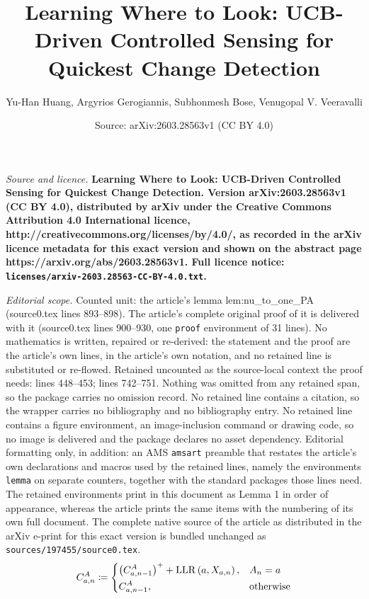 \documentclass[10pt,a4paper]{amsart}
\title{\LARGE \bf Learning Where to Look: UCB-Driven Controlled Sensing for Quickest Change Detection}
\author{Yu-Han Huang, Argyrios Gerogiannis, Subhonmesh Bose, Venugopal V. Veeravalli}
\date{Source: arXiv:2603.28563v1 (CC BY 4.0)}
\newcommand{\lp}{\left(}
\newcommand{\mrm}{\mathrm}
\newcommand{\rp}{\right)}
\begin{document}
\maketitle

\noindent\emph{Source and licence.} \LARGE \bf Learning Where to Look: UCB-Driven Controlled Sensing for Quickest Change Detection. Version arXiv:2603.28563v1 (CC BY 4.0), distributed by arXiv under the Creative Commons Attribution 4.0 International licence, http://creativecommons.org/licenses/by/4.0/, as recorded in the arXiv licence metadata for this exact version and shown on the abstract page https://arxiv.org/abs/2603.28563v1. Full licence notice: \texttt{licenses/arxiv-2603.28563-CC-BY-4.0.txt}.\par\smallskip

\noindent\textit{Editorial scope.} Counted unit: the article's lemma lem:nu\_to\_one\_PA (source0.tex lines 893--898). The article's complete original proof of it is delivered with it (source0.tex lines 900--930, one \texttt{proof} environment of 31 lines). No mathematics is written, repaired or re-derived: the statement and the proof are the article's own lines, in the article's own notation, and no retained line is substituted or re-flowed.  Retained uncounted as the source-local context the proof needs: lines 448--453; lines 742--751.  Nothing was omitted from any retained span, so the package carries no omission record.  No retained line contains a citation, so the wrapper carries no bibliography and no bibliography entry.  No retained line contains a figure environment, an image-inclusion command or drawing code, so no image is delivered and the package declares no asset dependency.  Editorial formatting only, in addition: an AMS \texttt{amsart} preamble that restates the article's own declarations and macros used by the retained lines, namely the environments \texttt{lemma} on separate counters, together with the standard packages those lines need.  The retained environments print in this document as Lemma 1 in order of appearance, whereas the article prints the same items with the numbering of its own full document.  The complete native source of the article as distributed in the arXiv e-print for this exact version is bundled unchanged as \texttt{sources/197455/source0.tex}.
\begin{align}\label{eq:CuSum_stat_sep}
    C_{a,n}^{A} \coloneqq \begin{dcases}
        \lp C_{a, n-1}^{A} \rp^{+} + \mrm{LLR} \lp a, X_{a, n} \rp,& A_{n} = a\\
        C_{a, n-1}^{A},& \mrm{otherwise}
    \end{dcases}
\end{align}
\end{document}
